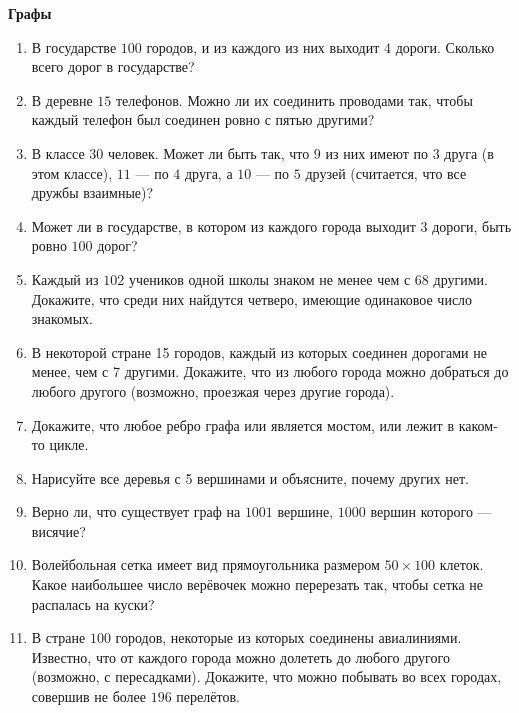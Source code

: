 \documentclass{article}
\begin{document}
\large
	
\begin{center}
	\textbf{Графы}
\end{center}


\begin{enumerate}[label*=\protect\fbox{\arabic{enumi}}]
	
\item В государстве $100$ городов, и из каждого из них выходит $4$ дороги. Сколько всего дорог в государстве?

\item В деревне $15$ телефонов. Можно ли их соединить проводами так, чтобы каждый телефон был соединен ровно с пятью другими?

\item В классе $30$ человек. Может ли быть так, что $9$ из них имеют по $3$ друга (в этом классе), $11$ — по $4$ друга, а $10$ — по $5$ друзей (считается, что все дружбы взаимные)?

\item Может ли в государстве, в котором из каждого города выходит $3$ дороги, быть ровно $100$ дорог?

\item Каждый из $102$ учеников одной школы знаком не менее чем с $68$ другими. Докажите, что среди них найдутся четверо, имеющие одинаковое число знакомых.

\item В некоторой стране 15 городов, каждый из которых соединен дорогами не менее, чем с 7 другими. Докажите, что из любого города можно добраться до любого другого (возможно, проезжая через другие города).

\item Докажите, что любое ребро графа или является мостом, или лежит в каком- то цикле.

\item Нарисуйте все деревья с 5 вершинами и объясните, почему других нет.

\item Верно ли, что существует граф на $1001$ вершине, $1000$ вершин которого — висячие?

\item Волейбольная сетка имеет вид прямоугольника размером $50 \times 100$ клеток. Какое наибольшее число верёвочек можно перерезать так, чтобы сетка не распалась на куски?

\item В стране $100$ городов, некоторые из которых соединены авиалиниями. Известно, что от каждого города можно долететь до любого другого (возможно, с пересадками). Докажите, что можно побывать во всех городах, совершив не более $196$ перелётов.


\end{enumerate}
\end{document}
